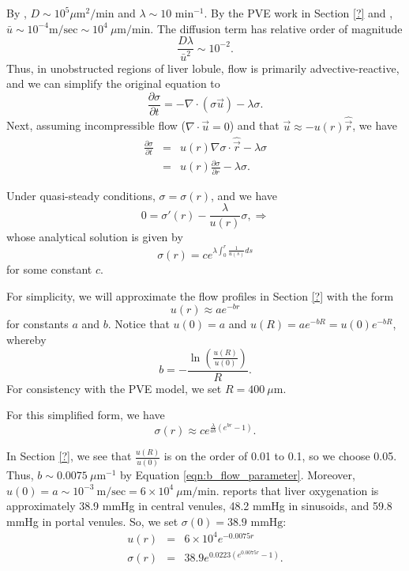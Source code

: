 \documentclass[smallextended,natbib]{svjour3}
\newcommand{\beqa}{\begin{eqnarray}}
\newcommand{\beq}{\begin{equation}}
\newcommand{\eeqa}{\end{eqnarray}}
\newcommand{\eeq}{\end{equation}}
\newcommand{\micron}{\mu\textrm{m}}
\newcommand{\hatvec}[1]{\hat{\vec{#1}}}
\begin{document}
By \citep{ghaffarizadeh15_bioinformatics}, 
$D \sim 10^5 \micron^2 / \textrm{min}$ and 
$\lambda \sim 10 \textrm{ min}^{-1}$. 
By the PVE work in Section \ref{?} and \citep{nishii}, 
$\bar{u} \sim 10^{-4} \textrm{m}/\textrm{sec} 
\sim 10^4 \:\micron/\textrm{min}$.  
The diffusion term has relative order of magnitude 
\beq
\frac{ D \lambda }{ \bar{u}^2}  \sim 10^{-2}. 
\eeq
Thus, in unobstructed regions of liver lobule, flow is primarily advective-reactive, and we can simplify the original equation  to 
\beq
\frac{ \partial \sigma }{ \partial t} = -\nabla \cdot \left( \sigma \vec{u} \right) - \lambda \sigma. 
\eeq
Next, assuming incompressible flow ($\nabla \cdot \vec{u} = 0$) and 
that $\vec{u} \approx - u(r) \hatvec{r}$, we have 
\beqa
\frac{\partial \sigma}{\partial t} & =& 
u(r) \nabla \sigma \cdot \hatvec{r} - \lambda \sigma \\
 & = & 
u(r) \frac{ \partial \sigma}{\partial r} - \lambda \sigma.  
\eeqa

Under quasi-steady conditions, $\sigma =\sigma(r)$, and we have 
\beq
0 = \sigma'(r) - \frac{ \lambda }{ u(r) } \sigma , 
\Longrightarrow 
\eeq
whose analytical solution is given by 
\beq
\sigma(r) = c e^{ \lambda \int_0^r \frac{1}{u(s)} ds }
\eeq
for some constant $c$.  

For simplicity, we will approximate the flow profiles in 
Section \ref{?} with the form 
\beq
u(r) \approx a e^{-b r} 
\eeq
for constants $a$ and $b$. 
Notice that $u(0) = a$ and $u(R) = a e^{-bR} = u(0) e^{-bR}$, whereby 
\beq
b = - \frac{ \ln \left( \frac{u(R)}{u(0)} \right) }{R} . 
\label{eqn:b_flow_parameter}
\eeq
For consistency with the PVE model, we set $R = 400\:\micron$. 

For this simplified form, we have 
\beq
\sigma(r) \approx  c e^{ \frac{ \lambda }{ ab} \left( e^{br} - 1 \right) }. 
\eeq

In Section \ref{?}, we see that $\frac{ u(R) }{ u(0) }$ is on the order of 0.01 to 0.1, so 
we choose 0.05. Thus, $b \sim 0.0075 \: \micron^{-1}$ by Equation \ref{eqn:b_flow_parameter}. 
Moreover, $u(0) = a \sim 10^{-3} \: \mathrm{m/sec} = 6 \times 10^4 \: \micron/\mathrm{min} $. 
\cite{tsukada} 
reports that liver oxygenation is approximately 38.9 mmHg in central venules, 48.2 mmHg in sinusoids, 
and 59.8 mmHg in portal venules. So, we set $\sigma(0) = 38.9 \textrm{ mmHg}$: 
\beqa
u(r) & = & 6 \times 10^4 e^{ -0.0075 r} \\
\sigma(r) & = & 38.9 e^{ 0.0223 \left( e^{0.0075 r } - 1 \right)  }. 
\eeqa
\end{document}
